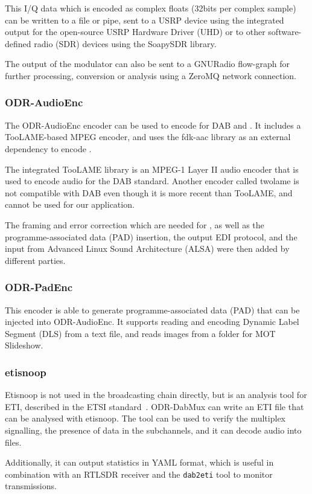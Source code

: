 This I/Q data which is encoded as complex floats (32bits per complex sample) can
be written to a file or pipe, sent to a USRP device using the integrated
output for the open-source USRP Hardware Driver (UHD) or to other
software-defined radio (SDR) devices using the
SoapySDR library.

The output of the modulator can also be sent to a GNURadio flow-graph for
further processing, conversion or analysis using a ZeroMQ network connection.

\subsubsection{ODR-AudioEnc}
The ODR-AudioEnc encoder can be used to encode for DAB and \dabplus. It includes
a TooLAME-based MPEG encoder, and uses the \mbox{fdk-aac} library as an external
dependency to encode \dabplus{}.

The integrated TooLAME library is an MPEG-1 Layer II audio encoder that is used
to encode audio for the DAB standard.
Another encoder called twolame is not compatible with DAB even though it is more
recent than TooLAME, and cannot be used for our application.

The framing and error correction which are needed for \dabplus{}, as well as the
programme-associated data (PAD) insertion, the output EDI protocol,
and the input from Advanced Linux Sound Architecture (ALSA) were then added by
different parties.

\subsubsection{ODR-PadEnc}
This encoder is able to generate programme-associated data (PAD) that can be
injected into ODR-AudioEnc. It supports reading and encoding Dynamic Label
Segment (DLS) from a text file, and reads images from a folder for MOT Slideshow.

\subsubsection{etisnoop}
Etisnoop is not used in the broadcasting chain directly, but is an analysis tool
for ETI, described in the ETSI standard~\cite{etsidabeti}. ODR-DabMux can write
an ETI file that can be analysed with etisnoop. The tool can be used to verify
the multiplex signalling, the presence of data in the subchannels, and it can
decode audio into files.

Additionally, it can output statistics in YAML format, which is useful in
combination with an RTLSDR receiver and the \verb+dab2eti+ tool to monitor
transmissions.

